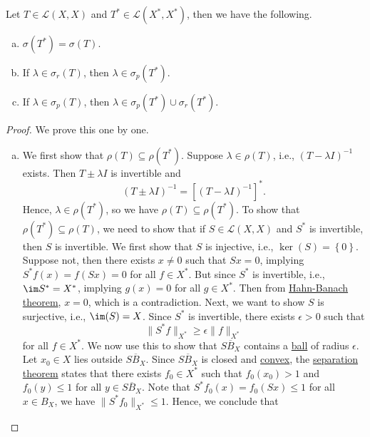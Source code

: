 \begin{theorem}\label{thm:lec21}
	Let \(T\in \mathcal{L} (X, X)\) and \(T^{\ast} \in \mathcal{L} (X^{\ast} , X^{\ast} )\), then we have the following.
	\begin{enumerate}[(a)]
		\item \(\sigma (T^{\ast} ) = \sigma (T)\).
		\item If \(\lambda \in \sigma _r(T)\), then \(\lambda \in \sigma _p(T^{\ast} )\).
		\item If \(\lambda \in \sigma _p(T)\), then \(\lambda \in \sigma _p(T^{\ast} ) \cup \sigma _r(T^{\ast} )\).
	\end{enumerate}
\end{theorem}
\begin{proof}\let\qed\relax
	We prove this one by one.
	\begin{enumerate}[(a)]
		\item We first show that \(\rho (T) \subseteq \rho (T^{\ast})\). Suppose \(\lambda \in \rho (T)\), i.e., \((T-\lambda I)^{-1} \) exists. Then \(T\pm \lambda I\) is invertible and
		      \[
			      (T\pm \lambda I)^{-1} = \left[ (T-\lambda I)^{-1}  \right] ^{\ast}.
		      \]
		      Hence, \(\lambda \in \rho (T^{\ast} )\), so we have \(\rho (T) \subseteq \rho (T^{\ast})\). To show that \(\rho (T^{\ast}) \subseteq \rho (T)\), we need to show that if \(S\in \mathcal{L} (X, X)\) and \(S^{\ast} \) is invertible, then \(S\) is invertible. We first show that \(S\) is injective, i.e., \(\ker(S)= \left\{ 0 \right\} \). Suppose not, then there exists \(x \neq 0\) such that \(Sx = 0\), implying \(S^{\ast} f(x) = f(Sx) = 0\) for all \(f\in X^{\ast} \). But since \(S^{\ast} \) is invertible, i.e., \(\im S^{\ast} = X^{\ast} \), implying \(g(x) = 0\) for all \(g\in X^{\ast} \). Then from \hyperref[thm:Hahn-Banach]{Hahn-Banach theorem}, \(x = 0\), which is a contradiction. Next, we want to show \(S\) is surjective, i.e., \(\im(S) = X\). Since \(S^{\ast} \) is invertible, there exists \(\epsilon >0\) such that
		      \[
			      \lVert S^{\ast} f \rVert _{X^{\ast} }\geq \epsilon \lVert f \rVert _{X^{\ast}}
		      \]
		      for all \(f\in X^{\ast} \). We now use this to show that \(\overline{SB_X}\) contains a \hyperref[def:ball]{ball} of radius \(\epsilon \). Let \(x_0\in X\) lies outside \(\overline{SB_X}\). Since \(\overline{SB_X}\) is closed and \hyperref[def:convex-set]{convex}, the \hyperref[thm:separation-of-a-point-from-a-convex-set]{separation theorem} states that there exists \(f_0\in X^{\ast} \) such that \(f_0(x_0)>1\) and \(f_0(y) \leq 1\) for all \(y\in \overline{SB_X}\). Note that \(S^{\ast} f_0(x) = f_0(Sx) \leq 1\) for all \(x\in B_X\), we have \(\lVert S^{\ast} f_0 \rVert_{X^{\ast} }\leq 1 \). Hence, we conclude that

\end{enumerate}
\end{proof}
